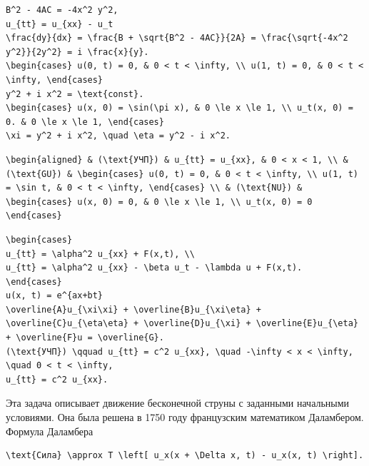 \documentclass[
  ukrainian,
]{article}
\begin{document}
\begin{verbatim}
B^2 - 4AC = -4x^2 y^2,
u_{tt} = u_{xx} - u_t
\frac{dy}{dx} = \frac{B + \sqrt{B^2 - 4AC}}{2A} = \frac{\sqrt{-4x^2 y^2}}{2y^2} = i \frac{x}{y}.
\begin{cases} u(0, t) = 0, & 0 < t < \infty, \\ u(1, t) = 0, & 0 < t < \infty, \end{cases}
y^2 + i x^2 = \text{const}.
\begin{cases} u(x, 0) = \sin(\pi x), & 0 \le x \le 1, \\ u_t(x, 0) = 0. & 0 \le x \le 1, \end{cases}
\xi = y^2 + i x^2, \quad \eta = y^2 - i x^2.
\end{verbatim}

\begin{verbatim}
\begin{aligned} & (\text{УЧП}) & u_{tt} = u_{xx}, & 0 < x < 1, \\ & (\text{GU}) & \begin{cases} u(0, t) = 0, & 0 < t < \infty, \\ u(1, t) = \sin t, & 0 < t < \infty, \end{cases} \\ & (\text{NU}) & \begin{cases} u(x, 0) = 0, & 0 \le x \le 1, \\ u_t(x, 0) = 0 \end{cases}
\end{verbatim}

\begin{verbatim}
\begin{cases}
u_{tt} = \alpha^2 u_{xx} + F(x,t), \\
u_{tt} = \alpha^2 u_{xx} - \beta u_t - \lambda u + F(x,t).
\end{cases}
u(x, t) = e^{ax+bt}
\overline{A}u_{\xi\xi} + \overline{B}u_{\xi\eta} + \overline{C}u_{\eta\eta} + \overline{D}u_{\xi} + \overline{E}u_{\eta} + \overline{F}u = \overline{G}.
(\text{УЧП}) \qquad u_{tt} = c^2 u_{xx}, \quad -\infty < x < \infty, \quad 0 < t < \infty,
u_{tt} = c^2 u_{xx}.
\end{verbatim}

Эта задача описывает движение бесконечной струны с заданными начальными
условиями. Она была решена в 1750 году французским математиком
Даламбером. Формула Даламбера

\begin{verbatim}
\text{Сила} \approx T \left[ u_x(x + \Delta x, t) - u_x(x, t) \right].
\end{verbatim}
\end{document}

